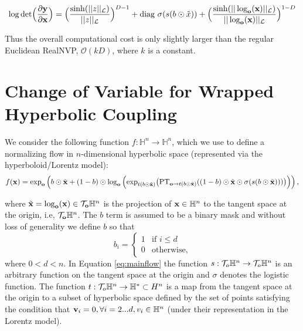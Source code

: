 \begin{equation}
    \log \textnormal{det}\Big (\frac{\partial \textbf{y}}{\partial \textbf{x}}\Big) = \Big(\frac{\sinh(||z||_{\mathcal{L}})}{||z||_{\mathcal{L}}}\Big)^{D-1} + \textnormal{diag} \ \sigma(s(b \odot \tilde{x})) + \Big(\frac{\sinh(||\log_{\textbf{o}}(\textbf{x})||_{\mathcal{L}})}{||\log_{\textbf{o}}(\textbf{x})||_{\mathcal{L}}}\Big)^{1-D}
\end{equation}

Thus the overall computational cost is only slightly larger than the regular Euclidean RealNVP, $\mathcal{O}(kD)$, where $k$ is a constant.

\section{Change of Variable for Wrapped Hyperbolic Coupling}
\label{wrapped_coupling_proof_appendix}
We consider the following function $f : \mathbb{H}^n \rightarrow \mathbb{H}^n$, which we use to define a normalizing flow in $n$-dimensional hyperbolic space (represented via the hyperboloid/Lorentz model): 
\begin{equation}\label{eq:mainflow}
    f(\mathbf{x}) = \textnormal{exp}_{\textbf{o}}\left( b \odot \tilde{
    \mathbf{x}} + (1-b) \odot \log_{\textbf{o}}\Big( \textnormal{exp}_{t(b \odot \tilde{\mathbf{x}})}\big(\textnormal{PT}_{\textbf{o}\to t(b \odot \tilde{\mathbf{x}}) }((1-b) \odot \tilde{\mathbf{x}} \odot \sigma(s(b \odot \tilde{\mathbf{x}})))\big)\Big) \right),
\end{equation}

where $\tilde{\mathbf{x}} = \log_{\mathbf{o}}(\mathbf{x}) \in \mathcal{T}_{\mathbf{o}}\mathbb{H}^n$ is the projection of $\mathbf{x} \in \mathbb{H}^n$ to the tangent space at the origin, i.e, $\mathcal{T}_{\mathbf{o}}\mathbb{H}^n$. 
The $b$ term is assumed to be a binary mask and without loss of generality we define $b$ so that
$$ 
b_i = 
\begin{cases}
1 &\textrm{if $i\leq d$}\\
0 &\textrm{otherwise},
\end{cases}
$$
where $0 < d < n$.
In Equation \eqref{eq:mainflow} the function $s : \mathcal{T}_o\mathbb{H}^n \rightarrow \mathcal{T}_o\mathbb{H}^n$ is an arbitrary function on the tangent space at the origin and $\sigma$ denotes the logistic function.
The function $t : \mathcal{T}_o\mathbb{H}^n \rightarrow \mathbb{H}^* \subset {H}^n$ is a map from the tangent space at the origin to a subset of hyperbolic space defined by the set of points satisfying the condition that $\mathbf{v}_i = 0, \forall i=2...d, v_i \in \mathbb{H}^n$ (under their representation in the Lorentz model).

